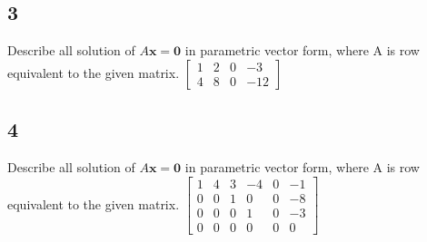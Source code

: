\documentclass{article}
\begin{document}
\subsection*{3}
Describe all solution of $A\mathbf{x}=\mathbf{0}$ in parametric vector form, where A is row equivalent to the given matrix.
$\begin{bmatrix}1&2&0&-3\\4&8&0&-12\end{bmatrix}$
\\ 
\subsection*{4}
Describe all solution of $A\mathbf{x}=\mathbf{0}$ in parametric vector form, where A is row equivalent to the given matrix.
$\begin{bmatrix}1&4&3&-4&0&-1\\0&0&1&0&0&-8\\0&0&0&1&0&-3\\0&0&0&0&0&0\end{bmatrix}$
\\ 
\end{document}
